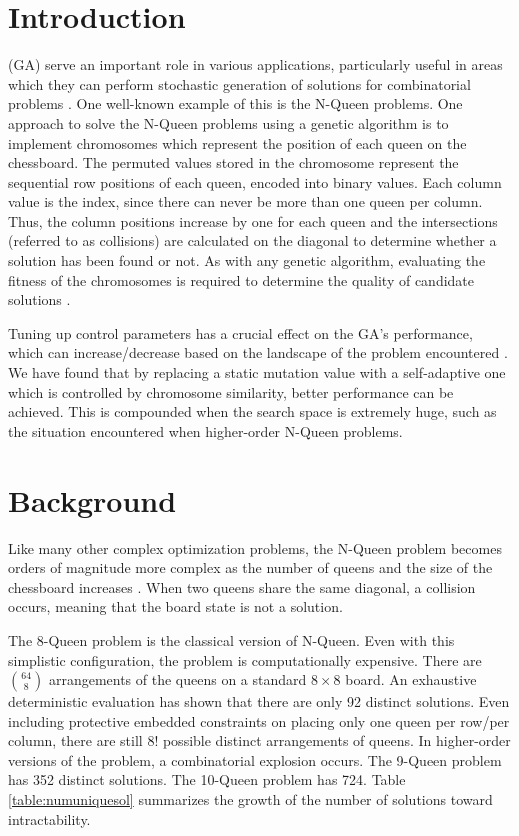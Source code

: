 \documentclass[conference]{IEEEtran}
\begin{document}

\section{Introduction}


 (GA) serve an important role in various applications, particularly useful in areas which they can perform stochastic generation of solutions for combinatorial problems \cite{de1989using,crawford1992solving}. One well-known example of this is the N-Queen problems. One approach to solve the N-Queen problems using a genetic algorithm is to implement chromosomes which represent the position of each queen on the chessboard. The permuted values stored in the chromosome represent the sequential row positions of each queen, encoded into binary values. Each column value is the index, since there can never be more than one queen per column. Thus, the column positions increase by one for each queen and the intersections (referred to as collisions) are calculated on the diagonal to determine whether a solution has been found or not. As with any genetic algorithm, evaluating the fitness of the chromosomes is required to determine the quality of candidate solutions \cite{srinivas1994genetic}. 

Tuning up control parameters has a crucial effect on the GA's performance, which can increase/decrease based on the landscape of the problem encountered \cite{ye2010some,coyne1994genetic,srinivas1994adaptive}. We have found that by replacing a static mutation value with a self-adaptive one which is controlled by chromosome similarity, better performance can be achieved. This is compounded when the search space is extremely huge, such as the situation encountered when higher-order N-Queen problems.


\section{Background}
Like many other complex optimization problems, the N-Queen problem becomes orders of magnitude more complex as the number of queens and the size of the chessboard increases \cite{homaifar1992queens}. When two queens share the same diagonal, a collision occurs, meaning that the board state is not a solution.

The 8-Queen problem is the classical version of N-Queen. Even with this simplistic configuration, the problem is computationally expensive. There are {$64 \choose 8$} arrangements of the queens on a standard {$8\times{}8$} board. An exhaustive deterministic evaluation has shown that there are only 92 distinct solutions. Even including protective embedded constraints on placing only one queen per row/per column, there are still {$8!$} possible distinct arrangements of queens. In higher-order versions of the problem, a combinatorial explosion occurs. The 9-Queen problem has 352 distinct solutions. The 10-Queen problem has 724. Table \ref{table:numuniquesol} summarizes the growth of the number of solutions toward intractability. 
\end{document}
